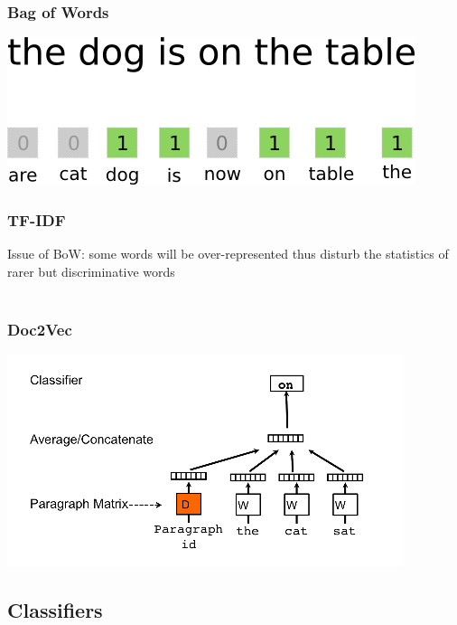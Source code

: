 \documentclass{beamer}
\begin{document}
\begin{frame}
\frametitle{Bag of Words}

\centering
\includegraphics[width=0.7\linewidth]{images/bow}

\end{frame}

\begin{frame}
\frametitle{TF-IDF}

Issue of BoW: some words will be over-represented thus disturb the statistics of rarer but discriminative words
\\~\\

\end{frame}

\begin{frame}
\frametitle{Doc2Vec \cite{le2014distributed}}

\centering
\includegraphics[width=0.9\linewidth]{images/doc2vec}

\end{frame}

\subsection{Classifiers}
\end{document}

